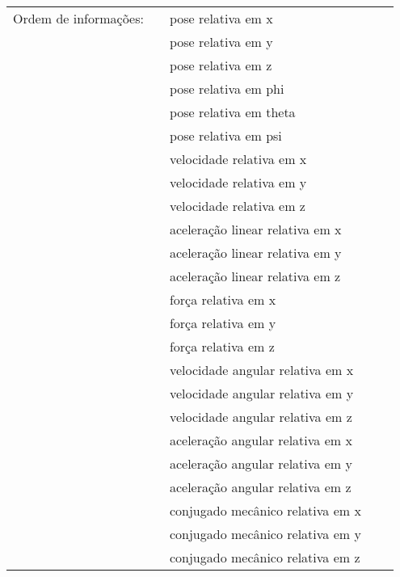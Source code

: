 			\begin{table}[h]
			\centering
			\begin{tabular}{|rr|lrr|}
			\hline
			\multicolumn{1}{|l}{Ordem de informações:} &       & pose relativa em x &       &  \\
			&       & pose relativa em y &       &         \\
			&       & pose relativa em z &       &         \\
			&       & pose relativa em phi &       &       \\
			&       & pose relativa em theta &       &       \\
			&       & pose relativa em   psi &       &       \\
			&       & velocidade relativa em x &       &       \\
			&       & velocidade relativa em y &       &       \\
			&       & velocidade relativa em z &       &       \\
			&       & aceleração linear relativa em x &       &        \\
			&       & aceleração linear relativa em y &       &        \\
			&       & aceleração linear relativa em z &       &        \\
			&       & força relativa em x &       &         \\
			&       & força relativa em y &       &         \\
			&       & força relativa em z &       &         \\
			&       & velocidade angular relativa em x        &       &  \\
			&       & velocidade angular relativa em y        &       &  \\
			&       & velocidade angular relativa em z        &       &  \\
			&       & aceleração angular relativa em x        &       &  \\
			&       & aceleração angular relativa em y        &       &  \\
			&       & aceleração angular relativa em z        &       &  \\
			&       & conjugado mecânico relativa em x        &       &  \\
			&       & conjugado mecânico relativa em y        &       &  \\
			&       & conjugado mecânico relativa em z        &       &  \\

\end{tabular}
\end{table}
